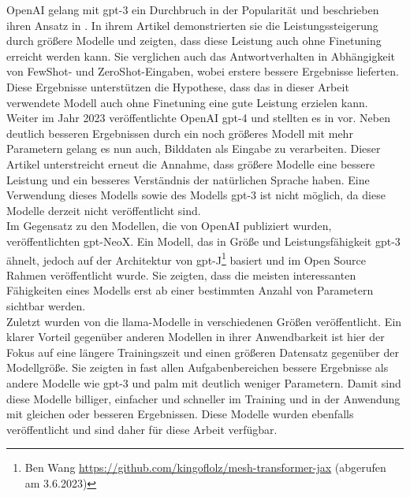 OpenAI gelang mit \ac{gpt}-3 ein Durchbruch in der Popularität und beschrieben ihren Ansatz in \citet{gpt3}.
In ihrem Artikel demonstrierten sie die Leistungssteigerung durch größere Modelle und zeigten, dass diese Leistung auch ohne Finetuning erreicht werden kann.
Sie verglichen auch das Antwortverhalten in Abhängigkeit von FewShot- und ZeroShot-Eingaben, wobei erstere bessere Ergebnisse lieferten.
Diese Ergebnisse unterstützen die Hypothese, dass das in dieser Arbeit verwendete Modell auch ohne Finetuning eine gute Leistung erzielen kann.\\

Weiter im Jahr 2023 veröffentlichte OpenAI \ac{gpt}-4 und stellten es in \citet{gpt4} vor.
Neben deutlich besseren Ergebnissen durch ein noch größeres Modell mit mehr Parametern gelang es nun auch, Bilddaten als Eingabe zu verarbeiten.
Dieser Artikel unterstreicht erneut die Annahme, dass größere Modelle eine bessere Leistung und ein besseres Verständnis der natürlichen Sprache haben.
Eine Verwendung dieses Modells sowie des Modells \ac{gpt}-3 ist nicht möglich, da diese Modelle derzeit nicht veröffentlicht sind.\\

Im Gegensatz zu den Modellen, die von OpenAI publiziert wurden, veröffentlichten \citet{gpt_neox} \ac{gpt}-NeoX.
Ein Modell, das in Größe und Leistungsfähigkeit \ac{gpt}-3 ähnelt, jedoch auf der Architektur von
\ac{gpt}-J\footnote{Ben Wang \url{https://github.com/kingoflolz/mesh-transformer-jax} (abgerufen am 3.6.2023)} basiert und im Open Source Rahmen veröffentlicht wurde.
Sie zeigten, dass die meisten interessanten Fähigkeiten eines Modells erst ab einer bestimmten Anzahl von Parametern sichtbar werden.\\

Zuletzt wurden von \citet{llama} die \ac{llama}-Modelle in verschiedenen Größen veröffentlicht.
Ein klarer Vorteil gegenüber anderen Modellen in ihrer Anwendbarkeit ist hier der Fokus auf eine längere Trainingszeit und einen größeren Datensatz gegenüber der Modellgröße. 
Sie zeigten in fast allen Aufgabenbereichen bessere Ergebnisse als andere Modelle wie \ac{gpt}-3 und \ac{palm} mit deutlich weniger Parametern.
Damit sind diese Modelle billiger, einfacher und schneller im Training und in der Anwendung mit gleichen oder besseren Ergebnissen.
Diese Modelle wurden ebenfalls veröffentlicht und sind daher für diese Arbeit verfügbar.


